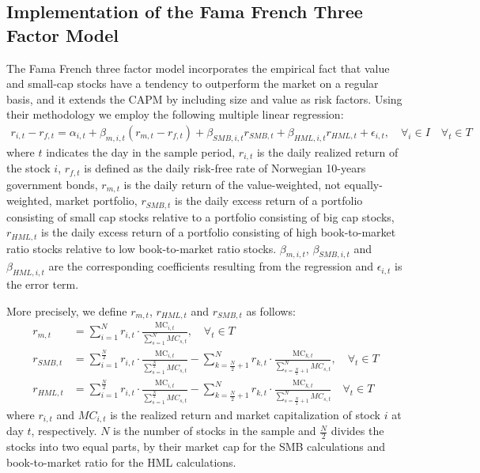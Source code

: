 \subsection{Implementation of the Fama French Three Factor Model} The Fama French three factor model incorporates the empirical fact that value and small-cap stocks have a tendency to outperform the market on a regular basis, and it extends the CAPM by including size and value as risk factors. Using their methodology we employ the following multiple linear regression:
\begin{align} 
    r_{i,t} - r_{f,t}= \alpha_{i,t} + \beta_{m,i,t}(r_{m,t} - r_{f,t}) + \beta_{SMB,i,t}r_{SMB,t} + \beta_{HML,i,t}r_{HML,t} + \epsilon_{i,t}, \quad  \forall_i \in I \quad  \forall_t \in T 
    \label{FFregression}
\end{align}
where $t$ indicates the day in the sample period, $r_{i,t}$ is the daily realized return of the stock $i$, $r_{f,t}$ is defined as the daily risk-free rate of Norwegian 10-years government bonds, $r_{m,t}$ is the daily return of the value-weighted, not equally-weighted, market portfolio, $r_{SMB,t}$ is the daily excess return of a portfolio consisting of small cap stocks relative to a portfolio consisting of big cap stocks, $r_{HML,t}$ is the daily excess return of a portfolio consisting of high book-to-market ratio stocks relative to low book-to-market ratio stocks. $\beta_{m,i,t}$, $\beta_{SMB,i,t}$ and $\beta_{HML,i,t}$ are the corresponding coefficients resulting from the regression and $\epsilon_{i,t}$ is the error term.

More precisely, we define $r_{m,t}$, $r_{HML,t}$ and $r_{SMB,t}$ as follows:
\begin{align}
    r_{m,t} &= \sum_{i=1}^{N} r_{i,t} \cdot \frac{\text{MC}_{i,t}}{\sum_{s=1}^{N} MC_{s,t}},  \quad  \forall_t \in T \\
    r_{SMB,t} &= \sum_{i=1}^{\frac{N}{2}} r_{i,t} \cdot \frac{\text{MC}_{i,t}}{\sum_{s=1}^{\frac{N}{2}} MC_{s,t}} - \sum_{k=\frac{N}{2}+1}^{N} r_{k,t} \cdot \frac{\text{MC}_{k,t}}{\sum_{s={\frac{N}{2}+1}}^{N} MC_{s,t}}, \quad  \forall_t \in T \\
    r_{HML,t} &= \sum_{i=1}^{\frac{N}{2}} r_{i,t} \cdot \frac{\text{MC}_{i,t}}{\sum_{s=1}^{\frac{N}{2}} MC_{s,t}} - \sum_{k=\frac{N}{2}+1}^{N} r_{k,t} \cdot \frac{\text{MC}_{k,t}}{\sum_{s=\frac{N}{2}+1}^{N} MC_{s,t}} \quad  \forall_t \in T
\end{align}
where $r_{i,t}$ and $MC_{i,t}$ is the realized return and market capitalization of stock $i$ at day $t$, respectively. $N$ is the number of stocks in the sample and $\frac{N}{2}$ divides the stocks into two equal parts, by their market cap for the SMB calculations and book-to-market ratio for the HML calculations.

